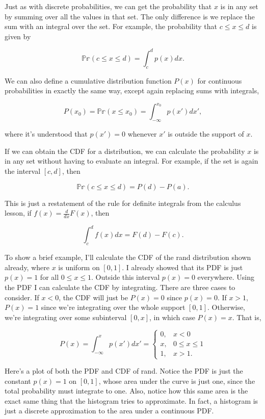 \documentclass[
  letterpaper,
  DIV=11,
  numbers=noendperiod]{scrreprt}
\begin{document}
Just as with discrete probabilities, we can get the probability that
\(x\) is in any set by summing over all the values in that set. The only
difference is we replace the sum with an integral over the set. For
example, the probability that \(c \leq x \leq d\) is given by

\[\mathbb{Pr}(c \leq x \leq d) = \int_c^d p(x)dx.\]

We can also define a cumulative distribution function \(P(x)\) for
continuous probabilities in exactly the same way, except again replacing
sums with integrals,

\[P(x_0) = \mathbb{Pr}(x \leq x_0) = \int_{-\infty}^{x_0} p(x')dx',\]

where it's understood that \(p(x')=0\) whenever \(x'\) is outside the
support of \(x\).

If we can obtain the CDF for a distribution, we can calculate the
probability \(x\) is in any set without having to evaluate an integral.
For example, if the set is again the interval \([c,d]\), then

\[\mathbb{Pr}(c \leq x \leq d) = P(d) - P(a).\]

This is just a restatement of the rule for definite integrals from the
calculus lesson, if \(f(x)=\frac{d}{dx}F(x)\), then

\[\int_c^d f(x) dx = F(d) - F(c).\]

To show a brief example, I'll calculate the CDF of the rand distribution
shown already, where \(x\) is uniform on \([0,1]\). I already showed
that its PDF is just \(p(x)=1\) for all \(0 \leq x \leq 1\). Outside
this interval \(p(x)=0\) everywhere. Using the PDF I can calculate the
CDF by integrating. There are three cases to consider. If \(x < 0\), the
CDF will just be \(P(x)=0\) since \(p(x)=0\). If \(x > 1\), \(P(x) = 1\)
since we're integrating over the whole support \([0,1]\). Otherwise,
we're integrating over some subinterval \([0,x]\), in which case
\(P(x)=x\). That is,

\[
P(x) = \int_{-\infty}^x p(x') dx' =
\begin{cases}
0, & x < 0 \\
x, & 0 \leq x \leq 1 \\
1, & x > 1.
\end{cases}\]

Here's a plot of both the PDF and CDF of rand. Notice the PDF is just
the constant \(p(x)=1\) on \([0,1]\), whose area under the curve is just
one, since the total probability must integrate to one. Also, notice how
this same area is the exact same thing that the histogram tries to
approximate. In fact, a histogram is just a discrete approximation to
the area under a continuous PDF.
\end{document}
